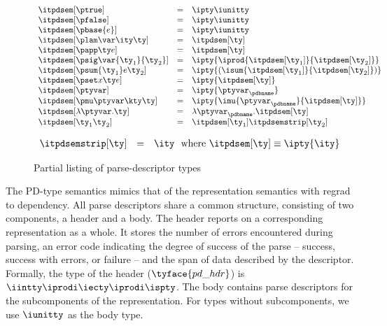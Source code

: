 \begin{figure}
\fbox{$\itpdsem[\ty] = \ity$}
\[ 
\begin{array}{lcl} 
\itpdsem[\ptrue] & = & \ipty \iunitty \\                                                  
\itpdsem[\pfalse] & = & \ipty \iunitty \\                                                  
\itpdsem[\pbase{e}] & = & \ipty \iunitty\\
\itpdsem[\plam \var \ity \ty] & = & \itpdsem[\ty] \\
\itpdsem[\papp \ty e] & = & \itpdsem[\ty] \\
\itpdsem[\psig \var {\ty_1} {\ty_2}] & = & 
               \ipty {\iprod {\itpdsem[\ty_1]} {\itpdsem[\ty_2]}} \\
\itpdsem[\psum {\ty_1} e {\ty_2}] & = & 
               \ipty {(\isum {\itpdsem[\ty_1]} {\itpdsem[\ty_2]})} \\
\itpdsem[\pset x \ty e] & = & \ipty {\itpdsem[\ty]} \\
\itpdsem[\ptyvar] & = & \ipty{\ptyvar_\pdbname} \\
\itpdsem[\pmu \ptyvar \kty \ty] & = & 
  \ipty{\imu{\ptyvar_\pdbname}{\itpdsem[\ty]}} \\
\itpdsem[\lambda \ptyvar.\ty]      
     & = & \lambda \ptyvar_\pdbname.\itpdsem[\ty] \\
\itpdsem[\ty_1 \ty_2]            & = & \itpdsem[\ty_1] \itpdsemstrip[\ty_2] \\
\end{array}
\]

\fbox{$\itpdsemstrip[\ty] = \ity$}

\[
\begin{array}{lcl} 
\itpdsemstrip[\ty] & = & \ity \ \ \mbox{where}\ \itpdsem[\ty] \equiv \ipty{\ity}
\end{array}
\]
\caption{Partial listing of parse-descriptor types}
\label{fig:pd-tys}
\end{figure}

The PD-type semantics mimics that of the representation semantics with
regrad to dependency. All parse descriptors share a common structure, consisting of two
components, a header and a body.  The header reports on a
corresponding representation as a whole. It stores the number of
errors encountered during parsing, an error code indicating the degree
of success of the parse -- success, success with errors, or failure --
and the span of data described by the descriptor.  Formally, the type
of the header ($\tyface{pd\_hdr}$) is $\iintty \iprodi \iecty \iprodi
\ispty$. The body contains parse descriptors for the subcomponents of
the representation. For types without subcomponents, we use $\iunitty$
as the body type.

